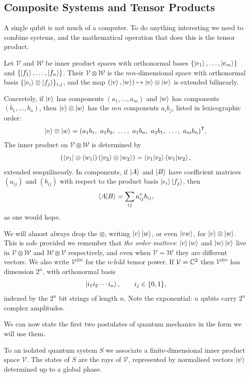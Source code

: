 \documentclass[a4paper]{scrartcl}
\newcommand{\Vs}{\mathcal{V}}
\newcommand{\Ws}{\mathcal{W}}
\begin{document}
\subsection{Composite Systems and Tensor Products}

A single qubit is not much of a computer. To do anything interesting we need to combine systems, and the mathematical operation that does this is the tensor product.

\begin{definition}
	Let $\Vs$ and $\Ws$ be inner product spaces with orthonormal bases $\{\ket{e_1},\dots,\ket{e_m}\}$ and $\{\ket{f_1},\dots,\ket{f_n}\}$. Their  $\Vs \otimes \Ws$ is the $mn$-dimensional space with orthonormal basis $\{\ket{e_i}\otimes\ket{f_j}\}_{i,j}$, and the map $(\ket{v},\ket{w}) \mapsto \ket{v}\otimes\ket{w}$ is extended bilinearly.
\end{definition}

Concretely, if $\ket{v}$ has components $(a_1,\dots,a_m)$ and $\ket{w}$ has components $(b_1,\dots,b_n)$, then $\ket{v}\otimes\ket{w}$ has the $mn$ components $a_i b_j$, listed in lexicographic order:
$$\ket{v} \otimes \ket{w} = (a_1b_1,\ a_1b_2,\ \dots,\ a_1 b_n,\ a_2b_1,\ \dots,\ a_mb_n)^{\mathsf T}.$$
The inner product on $\Vs \otimes \Ws$ is determined by
$$\left(\bra{v_1}\otimes\bra{w_1}\right)\left(\ket{v_2}\otimes\ket{w_2}\right) = \ip{v_1}{v_2}\ip{w_1}{w_2},$$
extended sesquilinearly. In components, if $\ket A$ and $\ket B$ have coefficient matrices $(a_{ij})$ and $(b_{ij})$ with respect to the product basis $\ket{e_i}\ket{f_j}$, then
$$\ip{A}{B} = \sum_{ij}a_{ij}^*b_{ij},$$
as one would hope.

We will almost always drop the $\otimes$, writing $\ket{v}\ket{w}$, or even $\ket{vw}$, for $\ket{v}\otimes\ket{w}$. This is safe provided we remember that \emph{the order matters}: $\ket{v}\ket{w}$ and $\ket{w}\ket{v}$ live in $\Vs\otimes\Ws$ and $\Ws\otimes\Vs$ respectively, and even when $\Vs = \Ws$ they are different vectors. We also write $\Vs^{\otimes n}$ for the $n$-fold tensor power. If $\Vs = \C^2$ then $\Vs^{\otimes n}$ has dimension $2^n$, with orthonormal basis
$$\ket{i_1 i_2 \cdots i_n}, \qquad i_j \in \{0,1\},$$
indexed by the $2^n$ bit strings of length $n$. Note the exponential: $n$ qubits carry $2^n$ complex amplitudes.

We can now state the first two postulates of quantum mechanics in the form we will use them.

\begin{axiom}[States]
	To an isolated quantum system $S$ we associate a finite-dimensional inner product space $\Vs$. The states of $S$ are the rays of $\Vs$, represented by normalised vectors $\ket{\psi}$ determined up to a global phase.
\end{axiom}
\end{document}
